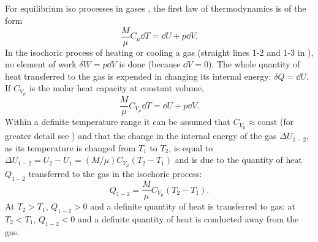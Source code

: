 \subsection{}\label{9.5.4} For equilibrium  iso­ processes in gases , the first law of thermodynamics  is of the form
\begin{equation*}%
\frac{M}{\mu} C_{\mu} \dd T = \dd U + p \dd V.
\end{equation*}
In the isochoric process   of heating or cooling a gas (straight lines 1-2 and 1-3 in ), no element of work $\delta W = p \dd V$ is done (because $\dd V = 0$). The whole quantity of heat trans­ferred to the gas is expended in changing its internal ener­gy: $\delta Q = \dd U$. If $C_{V_{\mu}}$ is the molar heat capacity at constant volume,
\begin{equation}%
\frac{M}{\mu} C_{V_{\mu}} \dd T = \dd U + p \dd V.
\tag{$\star$}
\end{equation}
Within a definite temperature range it can be assumed that $C_{V_{\mu}}\approx  \textrm{const}$ (for greater detail see ) and that the
change in the internal energy of the gas $\Delta U_{1-2}$, as its temper­ature is changed from $T_{1}$ to $T_{2}$, is equal to $\Delta U_{1-2} = U_{2} - U_{1} = (M/\mu) C_{V_{\mu}} (T_{2} - T_{1})$ and is due to the quantity of heat
$Q_{1-2}$ transferred to the gas in the isochoric process:
\begin{equation}%
Q_{1-2}  = \frac{M}{\mu} C_{V_{\mu}}(T_{2} - T_{1}).
\tag{$\star\star$}
\end{equation}
At $T_{2} > T_{1}$, $Q_{1-2}> 0$ and a definite quantity of heat is trans­ferred to gas; at $T_{2} < T_{1}$, $Q_{1-2} < 0$ and a definite quantity of heat is conducted away from the gas.

